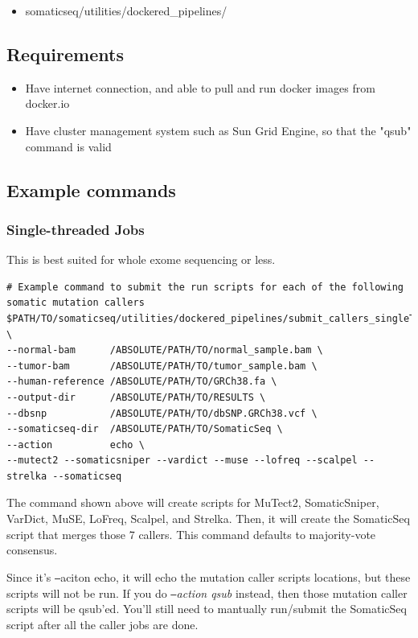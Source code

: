 \documentclass[10pt,letterpaper]{article}
\begin{document}
\begin{sloppypar}
  \begin{itemize}
    \item somaticseq/utilities/dockered\_pipelines/
  \end{itemize}

\subsection{Requirements}

  \begin{itemize}
    \item Have internet connection, and able to pull and run docker images from docker.io
    \item Have cluster management system such as Sun Grid Engine, so that the "qsub" command is valid
  \end{itemize}


\subsection{Example commands}


\subsubsection{Single-threaded Jobs}

This is best suited for whole exome sequencing or less. 

\begin{lstlisting}
# Example command to submit the run scripts for each of the following somatic mutation callers
$PATH/TO/somaticseq/utilities/dockered_pipelines/submit_callers_singleThread.sh \
--normal-bam      /ABSOLUTE/PATH/TO/normal_sample.bam \
--tumor-bam       /ABSOLUTE/PATH/TO/tumor_sample.bam \
--human-reference /ABSOLUTE/PATH/TO/GRCh38.fa \
--output-dir      /ABSOLUTE/PATH/TO/RESULTS \
--dbsnp           /ABSOLUTE/PATH/TO/dbSNP.GRCh38.vcf \
--somaticseq-dir  /ABSOLUTE/PATH/TO/SomaticSeq \
--action          echo \
--mutect2 --somaticsniper --vardict --muse --lofreq --scalpel --strelka --somaticseq
\end{lstlisting}
The command shown above will create scripts for MuTect2, SomaticSniper, VarDict, MuSE, LoFreq, Scalpel, and Strelka. Then, it will create the SomaticSeq script that merges those 7 callers. This command defaults to majority-vote consensus.

Since it's \texttt{--}aciton echo, it will echo the mutation caller scripts locations, but these scripts will not be run. If you do \textit{\texttt{--}action qsub} instead, then those mutation caller scripts will be qsub'ed. You'll still need to mantually run/submit the SomaticSeq script after all the caller jobs are done.




\end{sloppypar}
\end{document}
